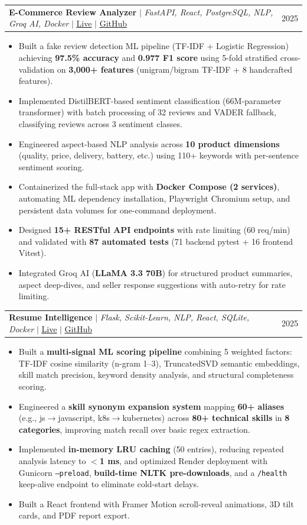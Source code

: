\documentclass[letterpaper,11pt]{article}
\makeatletter
\newcommand{\resumeItem}[1]{
  \item\small{
    {#1 \vspace{-2pt}}
  }
}
\newcommand{\resumeProjectHeading}[2]{
    \item
    \begin{tabular*}{0.97\textwidth}{l@{\extracolsep{\fill}}r}
      \small#1 & #2 \\
    \end{tabular*}\vspace{-7pt}
}
\newcommand{\resumeItemListStart}{\begin{itemize}}
\newcommand{\resumeItemListEnd}{\end{itemize}\vspace{-5pt}}
\makeatother
\begin{document}
      \resumeProjectHeading
          {\textbf{E-Commerce Review Analyzer} $|$ \emph{FastAPI, React, PostgreSQL, NLP, Groq AI, Docker} $|$ \href{https://e-commerce-review-analysis.vercel.app}{\underline{Live}} $|$ \href{https://github.com/RathodRonakiiitv/E-commerce-review-analysis}{\underline{GitHub}}}{2025}
          \resumeItemListStart
            \resumeItem{Built a fake review detection ML pipeline (TF-IDF + Logistic Regression) achieving \textbf{97.5\% accuracy} and \textbf{0.977 F1 score} using 5-fold stratified cross-validation on \textbf{3,000+ features} (unigram/bigram TF-IDF + 8 handcrafted features).}
            \resumeItem{Implemented DistilBERT-based sentiment classification (66M-parameter transformer) with batch processing of 32 reviews and VADER fallback, classifying reviews across 3 sentiment classes.}
            \resumeItem{Engineered aspect-based NLP analysis across \textbf{10 product dimensions} (quality, price, delivery, battery, etc.) using 110+ keywords with per-sentence sentiment scoring.}
            \resumeItem{Containerized the full-stack app with \textbf{Docker Compose (2 services)}, automating ML dependency installation, Playwright Chromium setup, and persistent data volumes for one-command deployment.}
            \resumeItem{Designed \textbf{15+ RESTful API endpoints} with rate limiting (60 req/min) and validated with \textbf{87 automated tests} (71 backend pytest + 16 frontend Vitest).}
            \resumeItem{Integrated Groq AI (\textbf{LLaMA 3.3 70B}) for structured product summaries, aspect deep-dives, and seller response suggestions with auto-retry for rate limiting.}
          \resumeItemListEnd

      \resumeProjectHeading
          {\textbf{Resume Intelligence} $|$ \emph{Flask, Scikit-Learn, NLP, React, SQLite, Docker} $|$ \href{https://resume-matching-project.vercel.app/}{\underline{Live}} $|$ \href{https://github.com/RathodRonakiiitv/resume-matching-project}{\underline{GitHub}}}{2025}
          \resumeItemListStart
            \resumeItem{Built a \textbf{multi-signal ML scoring pipeline} combining 5 weighted factors: TF-IDF cosine similarity (n-gram 1--3), TruncatedSVD semantic embeddings, skill match precision, keyword density analysis, and structural completeness scoring.}
            \resumeItem{Engineered a \textbf{skill synonym expansion system} mapping \textbf{60+ aliases} (e.g., js$\rightarrow$javascript, k8s$\rightarrow$kubernetes) across \textbf{80+ technical skills} in \textbf{8 categories}, improving match recall over basic regex extraction.}
            \resumeItem{Implemented \textbf{in-memory LRU caching} (50 entries), reducing repeated analysis latency to \textbf{$<$1 ms}, and optimized Render deployment with Gunicorn \texttt{--preload}, \textbf{build-time NLTK pre-downloads}, and a \texttt{/health} keep-alive endpoint to eliminate cold-start delays.}
            \resumeItem{Built a React frontend with Framer Motion scroll-reveal animations, 3D tilt cards, and PDF report export.}
          \resumeItemListEnd
\end{document}
